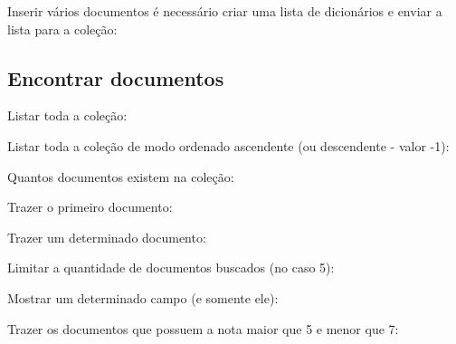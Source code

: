 Inserir vários documentos é necessário criar uma lista de dicionários e enviar a lista para a coleção: \\

\subsection{Encontrar documentos}
Listar toda a coleção: \\

Listar toda a coleção de modo ordenado ascendente (ou descendente - valor -1): \\

Quantos documentos existem na coleção: \\

Trazer o primeiro documento: \\

Trazer um determinado documento: \\

Limitar a quantidade de documentos buscados (no caso 5): \\

Mostrar um determinado campo (e somente ele): \\

Trazer os documentos que possuem a nota maior que 5 e menor que 7: \\

